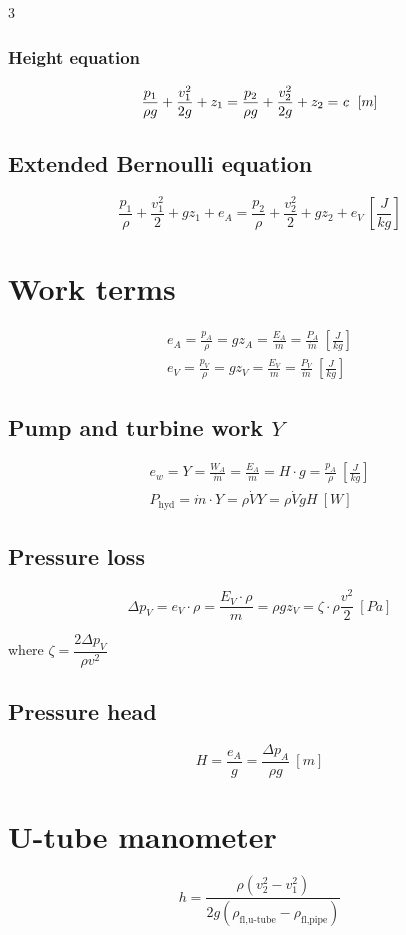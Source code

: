 \documentclass[9pt, landscape, a4paper]{article}
\newcommand{\const}{%
  \ \mathrel{\ooalign{%
    \hfil$c$\hfil\cr
    \hfil\kern0.10em\raisebox{-0.4ex}{\rule{0.08pt}{1.7ex}}\hfil\cr
  }}%
}
\begin{document}
\begin{multicols*}{3}
\subsubsection{Height equation}
\[\frac{p_1}{\rho g} + \frac{v_1^2}{2g} + z_1 = \frac{p_2}{\rho g} + \frac{v_2^2}{2g} + z_2 = \const\ \left[m\right]\]

\subsection{Extended Bernoulli equation}
\[\frac{p_1}{\rho} + \frac{v_1^2}{2} + gz_1 + e_A = \frac{p_2}{\rho} + \frac{v_2^2}{2} + gz_2 + e_V\ \left[\frac{J}{kg}\right]\]

\section{Work terms}
\begin{gather*}
  e_A = \frac{p_A}{\rho} = gz_A = \frac{E_A}{m} = \frac{P_A}{\dot{m}}\ \left[\frac{J}{kg}\right]\\[1ex]
  e_V = \frac{p_V}{\rho} = gz_V = \frac{E_V}{m} = \frac{P_V}{\dot{m}}\ \left[\frac{J}{kg}\right]
\end{gather*}

\subsection{Pump and turbine work $Y$}
\begin{gather*}
  e_w = Y = \frac{W_A}{\dot{m}} = \frac{E_A}{m} = H\cdot g = \frac{p_A}{\rho}\ \left[\frac{J}{kg}\right] \\[1ex]
  P_\text{hyd} = \dot{m}\cdot Y = \rho\dot{V}Y = \rho\dot{V}gH\ \left[W\right]
\end{gather*}

\subsection{Pressure loss}
\[\Delta p_V = e_V\cdot \rho = \frac{E_V \cdot \rho}{m} = \rho gz_V = \zeta \cdot \rho\dfrac{v^2}{2}\ \left[Pa\right]\]

where $\zeta = \dfrac{2\Delta p_V}{\rho v^2}$

\subsection{Pressure head}
\[H = \frac{e_A}{g} = \frac{\Delta p_A}{\rho g}\ \left[m\right]\]

\section{U-tube manometer}
\[h = \frac{\rho\left(v_2^2 - v_1^2\right)}{2g\left(\rho_\text{fl,u-tube} - \rho_\text{fl,pipe}\right)}\]

\end{multicols*}
\end{document}
